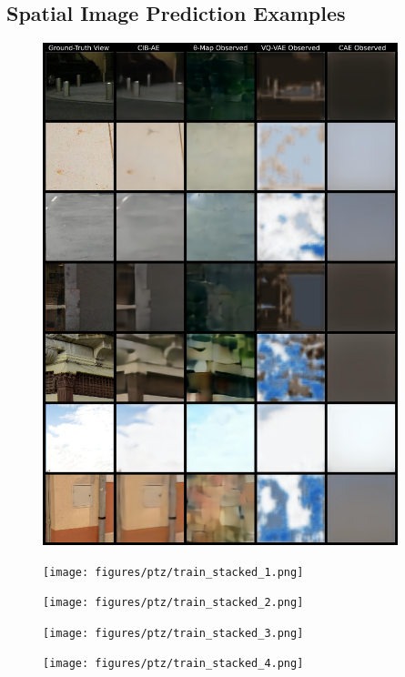 \begin{appendices}
\chapter{Spatial Image Prediction Examples} \label{ch:app-predictions}
\begin{figure}
    \centering
    \includegraphics[width=0.92\textwidth]{figures/ptz/train_stacked_0.png}
\end{figure}
\begin{figure}
    \centering
    \texttt{[image: figures/ptz/train\_stacked\_1.png]}
\end{figure}
\begin{figure}
    \centering
    \texttt{[image: figures/ptz/train\_stacked\_2.png]}
\end{figure}
\begin{figure}
    \centering
    \texttt{[image: figures/ptz/train\_stacked\_3.png]}
\end{figure}
\begin{figure}
    \centering
    \texttt{[image: figures/ptz/train\_stacked\_4.png]}
\end{figure}


\end{appendices}
